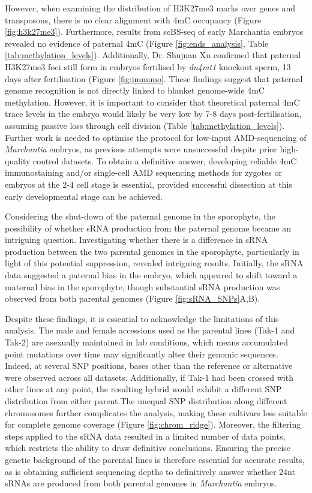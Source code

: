 However, when examining the distribution of H3K27me3 marks over genes and transposons, there is no clear alignment with 4mC occupancy (Figure \ref{fig:h3k27me3}). Furthermore, results from scBS-seq of early Marchantia embryos revealed no evidence of paternal 4mC (Figure \ref{fig:ends_analysis}, Table \ref{tab:methylation_levels}). Additionally, Dr. Shujuan Xu confirmed that paternal H3K27me3 foci still form in embryos fertilised by \textit{dn4mt1} knockout sperm, 13 days after fertilisation (Figure \ref{fig:immuno}. These findings suggest that paternal genome recognition is not directly linked to blanket genome-wide 4mC methylation. However, it is important to consider that theoretical paternal 4mC trace levels in the embryo would likely be very low by 7-8 days post-fertilisation, assuming passive loss through cell division (Table \ref{tab:methylation_levels}). Further work is needed to optimise the protocol for low-input AMD-sequencing of \textit{Marchantia} embryos, as previous attempts were unsuccessful despite prior high-quality control datasets. To obtain a definitive answer,  developing reliable 4mC immunostaining and/or single-cell AMD sequencing methods for zygotes or embryos at the 2-4 cell stage is essential, provided successful dissection at this early developmental stage can be achieved.

 Considering the shut-down of the paternal genome in the sporophyte, the possibility of whether sRNA production from the paternal genome became an intriguing question. Investigating whether there is a difference in sRNA production between the two parental genomes in the sporophyte, particularly in light of this potential suppression, revealed intriguing results. Initially, the sRNA data suggested a paternal bias in the embryo, which appeared to shift toward a maternal bias in the sporophyte, though substantial sRNA production was observed from both parental genomes (Figure \ref{fig:sRNA_SNPs}A,B). 
 
 Despite these findings, it is essential to acknowledge the limitations of this analysis. The male and female accessions used as the parental lines (Tak-1 and Tak-2) are asexually maintained in lab conditions, which means accumulated point mutations over time may significantly alter their genomic sequences. Indeed, at several SNP positions, bases other than the reference or alternative were observed across all datasets. Additionally, if Tak-1 had been crossed with other lines at any point, the resulting hybrid would exhibit a different SNP distribution from either parent.The unequal SNP distribution along different chromosomes further complicates the analysis, making these cultivars less suitable for complete genome coverage (Figure \ref{fig:chrom_ridge}). Moreover, the filtering steps applied to the sRNA data resulted in a limited number of data points, which restricts the ability to draw definitive conclusions. Ensuring the precise genetic background of the parental lines is therefore essential for accurate results, as is obtaining sufficient sequencing depths to definitively answer whether 24nt sRNAs are produced from both parental genomes in \textit{Marchantia} embryos. 
 
